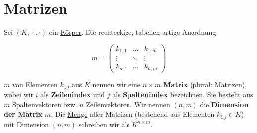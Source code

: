 \documentclass[../../main.tex]{subfiles}
\begin{document}
	
	\chapter{Matrizen}
	
	\begin{definition}
		\label{def:Matrix}
		\label{def:DimensionMatrix}
		\label{def:Spaltenindex}
		\label{def:Zeilenindex}
		Sei $(K,+,\cdot)$ ein \hyperref[def:Körper]{Körper}. Die rechteckige, tabellen-artige Anordnung 
		
		$$m = \begin{pmatrix}
			k_{1,1} & \dots & k_{1,m} \\
			\vdots  & \ddots & \vdots \\
			k_{n,1} & \dots & k_{n,m}
		\end{pmatrix}$$
		
		$m$ von Elementen $k_{i,j}$ aus $K$ nennen wir eine \textbf{$n\times m$ Matrix} (plural: Matrizen), wobei wir $i$ als \textbf{Zeilenindex} und $j$ als \textbf{Spaltenindex} bezeichnen. Sie besteht aus $m$ Spaltenvektoren bzw. $n$ Zeilenvektoren. Wir nennen $(n,m)$ die \textbf{Dimension der Matrix} $m$. Die \hyperref[def:Menge]{Menge} aller Matrizen (bestehend aus Elementen $k_{i,j} \in K$) mit Dimension $(n,m)$ schreiben wir als $K^{n \times m}$. 
	\end{definition}
	
\end{document}
